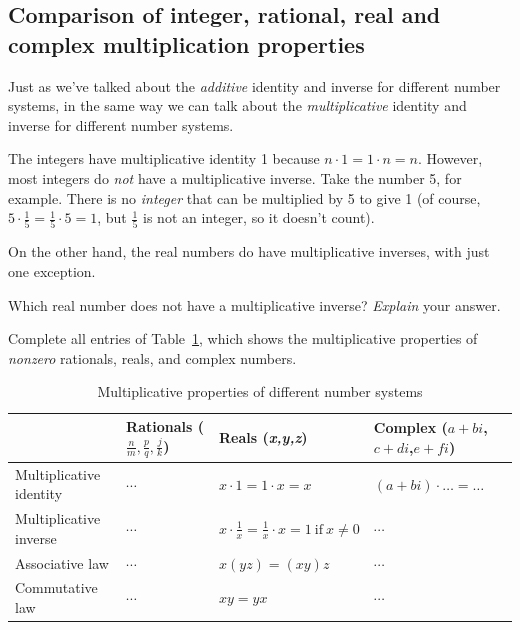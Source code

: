\subsection{Comparison of integer, rational, real and complex
multiplication properties}

Just as we've talked about the \emph{additive} identity and inverse
for different number systems, in the same way we can talk about the
\emph{multiplicative} identity and inverse for different number systems.

The integers have multiplicative identity 1 because $n\cdot1=1\cdot n=n$.
However, most integers do \emph{not} have a multiplicative inverse.
Take the number 5, for example. There is no \emph{integer} that can be multiplied by 5 to give 1 (of course, $5\cdot\frac{1}{5}=\frac{1}{5}\cdot5=1$,
but $\frac{1}{5}$ is not an integer, so it doesn't
count).

On the other hand, the real numbers do have multiplicative inverses,
with just one exception.

\begin{exercise}{14}
 Which real number does not
have a multiplicative inverse? \emph{Explain} your answer.
\end{exercise}

\begin{exercise}{15}
Complete all entries of Table~\ref{multiplicative_table}, which shows the multiplicative properties
of \emph{nonzero} rationals, reals, and complex numbers.

\begin{table}[!htb]
\caption{Multiplicative properties of different number systems}\label{multiplicative_table}
\begin{tabular}{|p{2.8cm}|p{2.0cm}|p{2.6 cm}|p{2.8cm}|}
\hline 
\rule{0pt}{2.6ex} & Rationals ($\frac{n}{m},\frac{p}{q},\frac{j}{k}$)  & Reals (\emph{x,y,z})  & Complex ($a+bi$, $c+di$,$e+fi$)\rule[-1.2ex]{0pt}{0pt}\tabularnewline
\hline
\hline 
\rule{0pt}{2.6ex} Multiplicative identity  &$\cdots$  & $x\cdot1=1\cdot x=x$  & $(a+bi)\cdot \ldots= \ldots$ \rule[-1.2ex]{0pt}{0pt} \tabularnewline
\hline 
\rule{0pt}{2.6ex} Multiplicative inverse  &  $\cdots$ & $x \cdot \frac{1}{x} = \frac{1}{x} \cdot x = 1 \mathrm{~if~} x\neq 0$  &  $\cdots$ \rule[-1.2ex]{0pt}{0pt} \tabularnewline
\hline 
\rule{0pt}{2.6ex} Associative law  & $\cdots$ & $x(yz) = (xy)z$  & $\cdots$ \rule[-1.2ex]{0pt}{0pt} \tabularnewline
\hline 
\rule{0pt}{2.6ex} Commutative law  & $\cdots$  & $xy = yx$ & $\cdots$ \rule[-1.2ex]{0pt}{0pt} \tabularnewline
\hline
\end{tabular}
\end{table}
\end{exercise}


